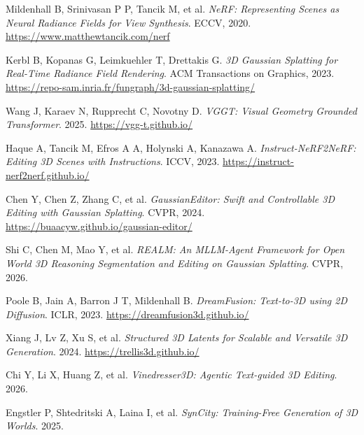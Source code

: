 \documentclass[12pt, a4paper]{article}
\begin{document}
\begin{enumerate}[label={[\arabic*]}, leftmargin=2.2em]
  \item Mildenhall B, Srinivasan P P, Tancik M, et al. \emph{NeRF: Representing Scenes as Neural Radiance Fields for View Synthesis}. ECCV, 2020. \url{https://www.matthewtancik.com/nerf}
  \item Kerbl B, Kopanas G, Leimkuehler T, Drettakis G. \emph{3D Gaussian Splatting for Real-Time Radiance Field Rendering}. ACM Transactions on Graphics, 2023. \url{https://repo-sam.inria.fr/fungraph/3d-gaussian-splatting/}
  \item Wang J, Karaev N, Rupprecht C, Novotny D. \emph{VGGT: Visual Geometry Grounded Transformer}. 2025. \url{https://vgg-t.github.io/}
  \item Haque A, Tancik M, Efros A A, Holynski A, Kanazawa A. \emph{Instruct-NeRF2NeRF: Editing 3D Scenes with Instructions}. ICCV, 2023. \url{https://instruct-nerf2nerf.github.io/}
  \item Chen Y, Chen Z, Zhang C, et al. \emph{GaussianEditor: Swift and Controllable 3D Editing with Gaussian Splatting}. CVPR, 2024. \url{https://buaacyw.github.io/gaussian-editor/}
  \item Shi C, Chen M, Mao Y, et al. \emph{REALM: An MLLM-Agent Framework for Open World 3D Reasoning Segmentation and Editing on Gaussian Splatting}. CVPR, 2026.
  \item Poole B, Jain A, Barron J T, Mildenhall B. \emph{DreamFusion: Text-to-3D using 2D Diffusion}. ICLR, 2023. \url{https://dreamfusion3d.github.io/}
  \item Xiang J, Lv Z, Xu S, et al. \emph{Structured 3D Latents for Scalable and Versatile 3D Generation}. 2024. \url{https://trellis3d.github.io/}
  \item Chi Y, Li X, Huang Z, et al. \emph{Vinedresser3D: Agentic Text-guided 3D Editing}. 2026.
  \item Engstler P, Shtedritski A, Laina I, et al. \emph{SynCity: Training-Free Generation of 3D Worlds}. 2025.
\end{enumerate}
\end{document}
